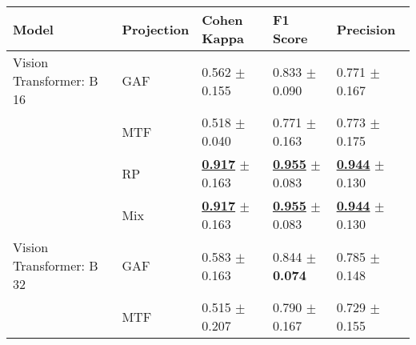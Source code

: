 
\begin{tabular}{lllll}
\toprule
Model & Projection & Cohen Kappa & F1 Score & Precision \\
\midrule
Vision Transformer: B 16 & GAF & \textcolor[rgb]{0.8060344828,0.1939655172,0}{0.562} $\pm$ \textcolor[rgb]{0.6038005131,0.3961994869,0}{0.155} & \textcolor[rgb]{0.6635330983,0.3364669017,0}{0.833} $\pm$ \textcolor[rgb]{0.1660886500,0.5000000000,0}{0.090} & \textcolor[rgb]{0.7352941176,0.2647058824,0}{0.771} $\pm$ \textcolor[rgb]{0.2475255307,0.5000000000,0}{0.167} \\
 & MTF & \textcolor[rgb]{0.9068965517,0.0931034483,0}{0.518} $\pm$ \textcolor[rgb]{0.1571792661,0.5000000000,0}{0.040} & \textcolor[rgb]{1.0000000000,0.0000000000,0}{0.771} $\pm$ \textcolor[rgb]{0.9515034911,0.0484965089,0}{0.163} & \textcolor[rgb]{0.7272727273,0.2727272727,0}{0.773} $\pm$ \textcolor[rgb]{0.2992303453,0.5000000000,0}{0.175} \\
 & RP & \underline{\textbf{\textcolor[rgb]{0.0000000000,0.5000000000,0}{0.917}}} $\pm$ \textcolor[rgb]{0.6327066559,0.3672933441,0}{0.163} & \underline{\textbf{\textcolor[rgb]{0.0000000000,0.5000000000,0}{0.955}}} $\pm$ \textcolor[rgb]{0.0919331644,0.5000000000,0}{0.083} & \underline{\textbf{\textcolor[rgb]{0.0000000000,0.5000000000,0}{0.944}}} $\pm$ \textcolor[rgb]{0.0065585724,0.5000000000,0}{0.130} \\
 & Mix & \underline{\textbf{\textcolor[rgb]{0.0000000000,0.5000000000,0}{0.917}}} $\pm$ \textcolor[rgb]{0.6327066559,0.3672933441,0}{0.163} & \underline{\textbf{\textcolor[rgb]{0.0000000000,0.5000000000,0}{0.955}}} $\pm$ \textcolor[rgb]{0.0919331644,0.5000000000,0}{0.083} & \underline{\textbf{\textcolor[rgb]{0.0000000000,0.5000000000,0}{0.944}}} $\pm$ \textcolor[rgb]{0.0065585724,0.5000000000,0}{0.130} \\
Vision Transformer: B 32 & GAF & \textcolor[rgb]{0.7586206897,0.2413793103,0}{0.583} $\pm$ \textcolor[rgb]{0.6327066559,0.3672933441,0}{0.163} & \textcolor[rgb]{0.6032119076,0.3967880924,0}{0.844} $\pm$ \textbf{\textcolor[rgb]{0.0000000000,0.5000000000,0}{0.074}} & \textcolor[rgb]{0.6764705882,0.3235294118,0}{0.785} $\pm$ \textcolor[rgb]{0.1272056114,0.5000000000,0}{0.148} \\
 & MTF & \textcolor[rgb]{0.9137931034,0.0862068966,0}{0.515} $\pm$ \textcolor[rgb]{0.8038825564,0.1961174436,0}{0.207} & \textcolor[rgb]{0.8918918919,0.1081081081,0}{0.790} $\pm$ \textcolor[rgb]{1.0000000000,0.0000000000,0}{0.167} & \textcolor[rgb]{0.9117647059,0.0882352941,0}{0.729} $\pm$ \textcolor[rgb]{0.1718378122,0.5000000000,0}{0.155} \\

\end{tabular}

